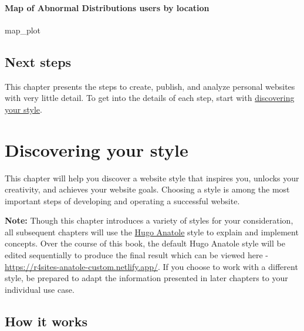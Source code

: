 \documentclass[
]{book}
\newenvironment{Shaded}{\begin{snugshade}}{\end{snugshade}}
\newcommand{\NormalTok}[1]{#1}
\begin{document}
\hypertarget{map-of-abnormal-distributions-users-by-location}{%
\subsubsection*{Map of Abnormal Distributions users by location}\label{map-of-abnormal-distributions-users-by-location}}

\begin{Shaded}
\begin{Highlighting}[]
\NormalTok{map\_plot}
\end{Highlighting}
\end{Shaded}

\hypertarget{next-steps}{%
\section{Next steps}\label{next-steps}}

This chapter presents the steps to create, publish, and analyze personal websites with very little detail. To get into the details of each step, start with \protect\hyperlink{choose-theme}{discovering your style}.

\hypertarget{choose-theme}{%
\chapter{Discovering your style}\label{choose-theme}}

This chapter will help you discover a website style that inspires you, unlocks your creativity, and achieves your website goals. Choosing a style is among the most important steps of developing and operating a successful website.

\textbf{Note:} Though this chapter introduces a variety of styles for your consideration, all subsequent chapters will use the \href{https://themes.gohugo.io/theme/anatole/}{Hugo Anatole} style to explain and implement concepts. Over the course of this book, the default Hugo Anatole style will be edited sequentially to produce the final result which can be viewed here - \url{https://r4sites-anatole-custom.netlify.app/}. If you choose to work with a different style, be prepared to adapt the information presented in later chapters to your individual use case.

\hypertarget{how-it-works}{%
\section{How it works}\label{how-it-works}}
\end{document}
